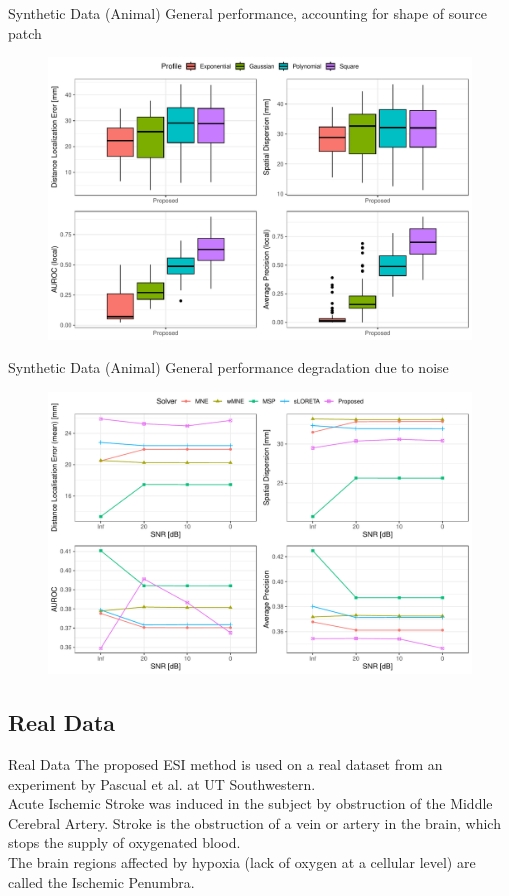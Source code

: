 \documentclass[progressbar=head]{beamer}
\begin{document}
\begin{frame}{Synthetic Data (Animal)}
General performance, accounting for shape of source patch
\begin{figure}
    \centering
    \includegraphics[width=0.7\linewidth]{img_stats/pig_shape_EvalMetrics_Protocol04_vol5k_pigALL.pdf}
\end{figure}
\end{frame}

\begin{frame}{Synthetic Data (Animal)}
General performance degradation due to noise
\begin{figure}
    \centering
    \includegraphics[width=0.7\linewidth]{img_stats/pig_SNRdegradation_EvalMetrics_protocol04_vol5k_pig.pdf}
\end{figure}
\end{frame}

{
\subsection{Real Data}
}

\begin{frame}{Real Data}
The proposed ESI method is used on a real dataset from an experiment by Pascual et al. \cite{pig_lesion1, PMID_36109613} at UT Southwestern.\\

Acute Ischemic Stroke was induced in the subject by obstruction of the Middle
Cerebral Artery. Stroke is the obstruction of a vein or artery in the
brain, which stops the supply of oxygenated blood.\\

 The brain regions affected by
hypoxia (lack of oxygen at a cellular level) are called the Ischemic Penumbra.
\end{frame}
\end{document}
